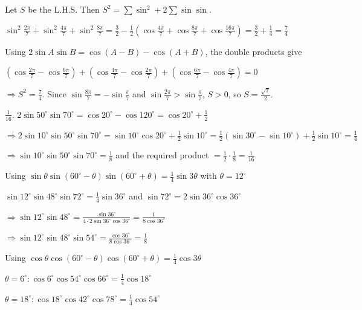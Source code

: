 \item Let $S$ be the L.H.S. Then $S^2 = \sum\sin^2 + 2\sum\sin\sin$.

  $\sin^2\frac{2\pi}{7} + \sin^2\frac{4\pi}{7} + \sin^2\frac{8\pi}{7} = \frac{3}{2} - \frac{1}{2}\left(\cos\frac{4\pi}{7} +
  \cos\frac{8\pi}{7} + \cos\frac{16\pi}{7}\right) = \frac{3}{2} + \frac{1}{4} = \frac{7}{4}$

  Using $2\sin A\sin B = \cos(A - B) - \cos(A + B)$, the double products give

  $\left(\cos\frac{2\pi}{7} - \cos\frac{6\pi}{7}\right) + \left(\cos\frac{4\pi}{7} - \cos\frac{2\pi}{7}\right) +
  \left(\cos\frac{6\pi}{7} - \cos\frac{4\pi}{7}\right) = 0$

  $\Rightarrow S^2 = \frac{7}{4}$. Since $\sin\frac{8\pi}{7} = -\sin\frac{\pi}{7}$ and $\sin\frac{2\pi}{7} > \sin\frac{\pi}{7}$,
  $S > 0$, so $S = \frac{\sqrt{7}}{2}$.

\item $\frac{1}{16}$. $2\sin 50^\circ\sin 70^\circ = \cos 20^\circ - \cos 120^\circ = \cos 20^\circ + \frac{1}{2}$

  $\Rightarrow 2\sin 10^\circ\sin 50^\circ\sin 70^\circ = \sin 10^\circ\cos 20^\circ + \frac{1}{2}\sin 10^\circ =
  \frac{1}{2}(\sin 30^\circ - \sin 10^\circ) + \frac{1}{2}\sin 10^\circ = \frac{1}{4}$

  $\Rightarrow \sin 10^\circ\sin 50^\circ\sin 70^\circ = \frac{1}{8}$ and the required product $= \frac{1}{2}\cdot\frac{1}{8} =
  \frac{1}{16}$

\item Using $\sin\theta\sin(60^\circ - \theta)\sin(60^\circ + \theta) = \frac{1}{4}\sin 3\theta$ with $\theta = 12^\circ$

  $\sin 12^\circ\sin 48^\circ\sin 72^\circ = \frac{1}{4}\sin 36^\circ$ and $\sin 72^\circ = 2\sin 36^\circ\cos 36^\circ$

  $\Rightarrow \sin 12^\circ\sin 48^\circ = \frac{\sin 36^\circ}{4\cdot 2\sin 36^\circ\cos 36^\circ} = \frac{1}{8\cos
  36^\circ}$

  $\Rightarrow \sin 12^\circ\sin 48^\circ\sin 54^\circ = \frac{\cos 36^\circ}{8\cos 36^\circ} = \frac{1}{8}$

\item Using $\cos\theta\cos(60^\circ - \theta)\cos(60^\circ + \theta) = \frac{1}{4}\cos 3\theta$

  $\theta = 6^\circ: \cos 6^\circ\cos 54^\circ\cos 66^\circ = \frac{1}{4}\cos 18^\circ$

  $\theta = 18^\circ: \cos 18^\circ\cos 42^\circ\cos 78^\circ = \frac{1}{4}\cos 54^\circ$

